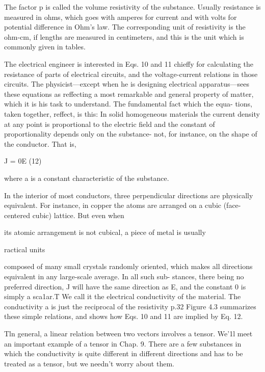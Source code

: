 The factor p is called the volume resistivity of the substance. Usually
resistance is measured in ohms, which goes with amperes for current
and with volts for potential difference in Ohm's law. The corresponding
unit of resistivity is the ohm-cm, if lengths are measured
in centimeters, and this is the unit which is commonly given in tables.

The electrical engineer is interested in Eqs. 10 and 11 chieffy for
calculating the resistance of parts of electrical circuits, and the
voltage-current relations in those circuits. The physicist---except
when he is designing electrical apparatus---sees these equations as
reffecting a most remarkable and general property of matter, which
it is his task to understand. The fundamental fact which the equa-
tions, taken together, reffect, is this: In solid homogeneous materials
the current density at any point is proportional to the electric field
and the constant of proportionality depends only on the substance-
not, for instance, on the shape of the conductor. That is,

J = 0E (12)
\begin{equation}
\end{equation}

where a is a constant characteristic of the substance.

In the interior of most conductors, three perpendicular directions
are physically equivalent. For instance, in copper the atoms are
arranged on a cubic (face-centered cubic) lattice. But even when

its atomic arrangement is not cubical, a piece of metal is usually

ractical units

composed of many small crystals randomly oriented, which makes
all directions equivalent in any large-scale average. In all such sub-
stances, there being no preferred direction, J will have the same
direction as E, and the constant 0 is simply a sca1ar.T We call it the
electrical conductivity of the material. The conductivity a is just the
reciprocal of the resistivity p.32 Figure 4.3 summarizes these simple
relations, and shows how Eqs. 10 and 11 are implied by Eq. 12.

Tln general, a linear relation between two vectors involves a tensor. We'1l meet an
important example of a tensor in Chap. 9. There are a few substances in which the
conductivity is quite different in different directions and has to be treated as a tensor,
but we needn't worry about them.


